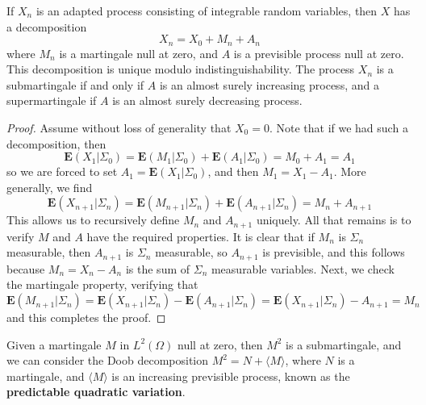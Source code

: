 \begin{theorem}
    If $X_n$ is an adapted process consisting of integrable random variables, then $X$ has a decomposition
    \[ X_n = X_0 + M_n + A_n \]
    where $M_n$ is a martingale null at zero, and $A$ is a previsible process null at zero. This decomposition is unique modulo indistinguishability. The process $X_n$ is a submartingale if and only if $A$ is an almost surely increasing process, and a supermartingale if $A$ is an almost surely decreasing process.
\end{theorem}
\begin{proof}
    Assume without loss of generality that $X_0 = 0$. Note that if we had such a decomposition, then
    \[ \mathbf{E}(X_1|\Sigma_0) = \mathbf{E}(M_1|\Sigma_0) + \mathbf{E}(A_1|\Sigma_0) = M_0 + A_1 = A_1 \]
    so we are forced to set $A_1 = \mathbf{E}(X_1|\Sigma_0)$, and then $M_1 = X_1 - A_1$. More generally, we find
    \[ \mathbf{E}(X_{n+1}|\Sigma_n) = \mathbf{E}(M_{n+1}|\Sigma_n) + \mathbf{E}(A_{n+1}|\Sigma_n) = M_n + A_{n+1} \]
    This allows us to recursively define $M_n$ and $A_{n+1}$ uniquely. All that remains is to verify $M$ and $A$ have the required properties. It is clear that if $M_n$ is $\Sigma_n$ measurable, then $A_{n+1}$ is $\Sigma_n$ measurable, so $A_{n+1}$ is previsible, and this follows because $M_n = X_n - A_n$ is the sum of $\Sigma_n$ measurable variables. Next, we check the martingale property, verifying that
    \[ \mathbf{E}(M_{n+1}|\Sigma_n) = \mathbf{E}(X_{n+1}|\Sigma_n) - \mathbf{E}(A_{n+1}|\Sigma_n) = \mathbf{E}(X_{n+1}|\Sigma_n) - A_{n+1} = M_n \]
    and this completes the proof.
\end{proof}

Given a martingale $M$ in $L^2(\Omega)$ null at zero, then $M^2$ is a submartingale, and we can consider the Doob decomposition $M^2 = N + \langle M \rangle$, where $N$ is a martingale, and $\langle M \rangle$ is an increasing previsible process, known as the {\bf predictable quadratic variation}.


